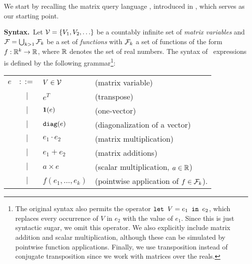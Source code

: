 We start by recalling the matrix query language \lang, introduced in \cite{matlang}, which serves as our starting point.

\smallskip
\noindent
\textbf{Syntax.}\,  Let $\mathcal{V} = \{V_1, V_2, \ldots\}$ be a countably infinite set of \textit{matrix variables} and $\mathcal{F}=\bigcup_{k>1}\mathcal{F}_k$ be a set of \textit{functions} with
$\mathcal{F}_k$ a set of functions of the  form $f:\mathbb{R}^k \to \mathbb{R}$, where $\mathbb{R}$ denotes the set of real numbers. The syntax of \lang\ expressions is defined by the following grammar\footnote{The original syntax also permits the operator $\texttt{let } V = e_1 \texttt{ in } e_2$, which replaces every occurrence of $V$ in $e_2$ with the value of $e_1$. Since this is just syntactic sugar, we omit this operator. We also explicitly include matrix addition and scalar multiplication, although these can be simulated by pointwise function applications. Finally, we use transposition instead of conjugate transposition since we work with matrices over the reals.}:


\begin{tabular}{lcll}
$e$ & $::=$ & $V\in \mathcal{V}$ & (matrix variable)\\
 & $|$ & $e^T$ & (transpose)\\ 
 & $|$ & $\mathbf{1}(e)$ & (one-vector)\\ 
 & $|$ & $\texttt{diag}(e)$ & (diagonalization of a vector)\\  
 & $|$ & $e_1 \cdot e_2$ & (matrix multiplication)\\   
 & $|$ & $e_1 + e_2$ & (matrix additions)\\   
 & $|$ & $a\times e$ & (scalar multiplication, $a\in\mathbb{R}$)\\   
  & $|$ & $f(e_1,\ldots ,e_k)$ & (pointwise application of $f\in\mathcal{F}_k$).    
\end{tabular}

